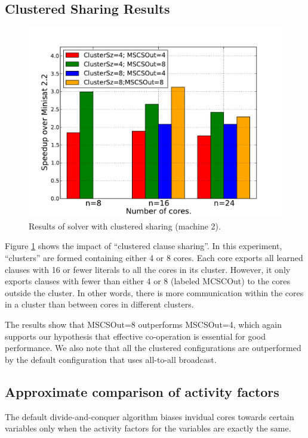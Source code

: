 \documentclass[letterpaper, compsoc, conference]{IEEEtran}
\begin{document}
\subsection{Clustered Sharing Results}
\begin{figure}[htbp]
  \includegraphics[width=\columnwidth]{images/cluster.pdf}
  \caption{Results of solver with clustered sharing (machine 2).}
  \label{fig:clusterres}
\end{figure}

Figure \ref{fig:clusterres} shows the impact of ``clustered clause sharing''. In
this experiment, ``clusters'' are formed containing either 4 or 8 cores. Each
core exports all learned clauses with 16 or fewer literals to all the cores in
its cluster. However, it only exports clauses with fewer than either 4 or 8
(labeled MCSCOut) to the cores outside the cluster. In other words, there is
more communication within the cores in a cluster than between cores in different
clusters.

The results show that MSCSOut=8 outperforms MSCSOut=4, which again supports our
hypothesis that effective co-operation is essential for good performance. We
also note that all the clustered configurations are outperformed by the default
configuration that uses all-to-all broadcast. 


\subsection{Approximate comparison of activity factors}
\label{sec:fuzzy activity}
The default divide-and-conquer algorithm biases invidual cores towards certain
variables only when the activity factors for the variables are exactly the same.
\end{document}
